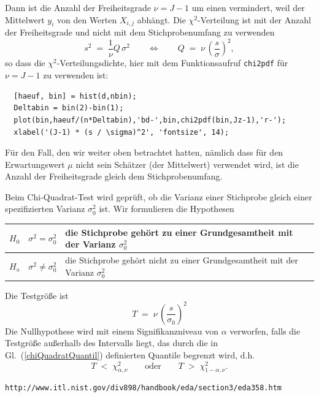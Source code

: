 Dann ist die Anzahl der Freiheitsgrade $\nu = J-1$ um einen vermindert,
weil der Mittelwert $y_i$ von den Werten $X_{i,j}$ abhängt. Die $\chi^2$-Verteilung
ist mit der Anzahl der Freiheitsgrade und nicht mit dem Stichprobenumfang zu verwenden
\begin{equation}
s^2 \; = \; \frac{1}{\nu} Q \, \sigma^2  \qquad \Leftrightarrow \qquad 
Q \; = \; \nu \, \left( \frac{s}{\sigma} \right)^2 ,
\label{s2Qempir}
\end{equation}
so dass die $\chi^2$-Verteilungsdichte, hier mit dem Funktionsaufruf
\texttt{chi2pdf} für $\nu = J-1$ zu verwenden ist:
\begin{lstlisting}
  [haeuf, bin] = hist(d,nbin);
  Deltabin = bin(2)-bin(1);
  plot(bin,haeuf/(n*Deltabin),'bd-',bin,chi2pdf(bin,Jz-1),'r-');
  xlabel('(J-1) * (s / \sigma)^2', 'fontsize', 14);
\end{lstlisting}

Für den Fall, den wir weiter oben betrachtet hatten, nämlich dass für den Erwartungswert
$\mu$ nicht sein Schätzer (der Mittelwert) verwendet wird, ist die Anzahl der
Freiheitsgrade gleich dem Stichprobenumfang.

Beim Chi-Quadrat-Test wird geprüft, ob die Varianz einer Stichprobe gleich einer
spezifizierten Varianz $\sigma_0^2$ ist. Wir formulieren die Hypothesen
\begin{center}
\begin{tabular}{c|cl}
$H_0$ & $\sigma^2 = \sigma_0^2$ & die Stichprobe gehört zu einer Grundgesamtheit mit der Varianz $\sigma_0^2$\\
\hline
$H_\mathrm{a}$ & $\sigma^2 \neq \sigma_0^2$ & die Stichprobe gehört nicht zu einer Grundgesamtheit mit der Varianz $\sigma_0^2$
\end{tabular}
\end{center}
Die Testgröße ist
\begin{equation}
T \; = \; \nu \, \left( \frac{s}{\sigma_0} \right)^2
\label{chi2testgroesse}
\end{equation}
Die Nullhypothese wird mit einem Signifikanzniveau von $\alpha$
verworfen, falls die Testgröße außerhalb des Intervalls liegt,
das durch die in Gl.~(\ref{chiQuadratQuantil}) definierten Quantile begrenzt wird, d.h.
\begin{equation}
T \; < \; \chi^2_{\alpha, \nu}  \qquad \mathrm{oder} \qquad
T \; > \; \chi^2_{1-\alpha, \nu} .
\end{equation}

\begin{verbatim}
http://www.itl.nist.gov/div898/handbook/eda/section3/eda358.htm
\end{verbatim} 

